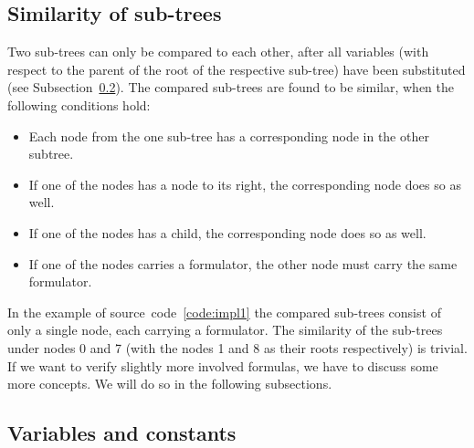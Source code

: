 \documentclass[british]{article}
\newcommand\prv{bc}
\newcommand\m[1]{\texttt{#1}}
\begin{document}

\pagebreak{}

\subsection{Similarity of sub-trees}\label{sec:similar}
\textcolor{dartmouthgreen}{Two sub-trees can only be compared to each other,
after all variables (with respect to the parent of the root of the
respective sub-tree) have been substituted (see Subsection~\ref{sec:var}).} The
compared sub-trees are found to be similar, when the following conditions hold:

\begin{itemize}
	\item 
		Each node from the one sub-tree has a corresponding node in the other
		subtree.
	\item
		If one of the nodes has a node to its right, the corresponding node does
		so as well.
	\item
		If one of the nodes has a child, the corresponding node does so as well.
	\item
		If one of the nodes carries a formulator, the other node must carry the
		same formulator.
\end{itemize}

In the example of source~code~\ref{code:impl1} the compared sub-trees consist of
only a single node, each carrying a formulator. The similarity of the sub-trees
under nodes 0 and 7 (with the nodes 1 and 8 as their roots respectively) is
trivial. If we want to verify slightly more involved formulas, we have to
discuss some more concepts. We will do so in the following subsections.

\subsection{Variables and constants}\label{sec:var}
\end{document}
